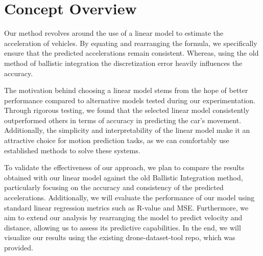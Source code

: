 \section{Concept Overview}

Our method revolves around the use of a linear model to estimate the acceleration of vehicles.
By equating and rearranging the formula, we specifically ensure that the predicted accelerations remain consistent. 
Whereas, using the old method of ballistic integration the discretization error heavily influences the accuracy.

The motivation behind choosing a linear model stems from the hope of better performance compared 
to alternative models tested during our experimentation. 
Through rigorous testing, we found that the selected linear model consistently outperformed others in 
terms of accuracy in predicting the car's movement. 
Additionally, the simplicity and interpretability of the linear model make it an attractive choice for 
motion prediction tasks, as we can comfortably use established methods to solve these systems. 

To validate the effectiveness of our approach, we plan to compare the results obtained with our linear 
model against the old Ballistic Integration method, particularly focusing on the accuracy and consistency of 
the predicted accelerations. 
Additionally, we will evaluate the performance of our model using standard linear regression metrics such as 
R-value and MSE. 
Furthermore, we aim to extend our analysis by rearranging the model to predict velocity and distance, 
allowing us to assess its predictive capabilities.
In the end, we will visualize our results using the existing drone-dataset-tool repo, 
which was provided.


